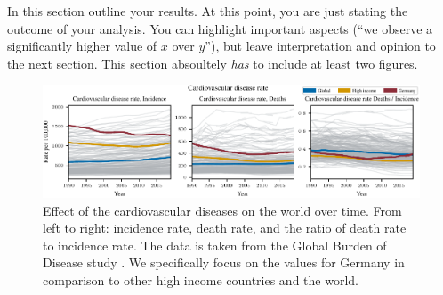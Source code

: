 In this section outline your results. At this point, you are just stating the outcome of your analysis. You can highlight important aspects (``we observe a significantly higher value of $x$ over $y$''), but leave interpretation and opinion to the next section. This section absoultely \emph{has} to include at least two figures.


\begin{figure}[h]
    \vskip 0.2in
    \centering
    \centerline{\includegraphics[]{fig/fig_cardiovascular_disease_mortality_rate.pdf}}
    \caption{Effect of the cardiovascular diseases on the world over time. From left to right: incidence rate, death rate, 
    and the ratio of death rate to incidence rate. The data is taken from the Global Burden of Disease study \citep{GBD2019}. We specifically focus on the values 
    for Germany in comparison to other high income countries and the world.}
    \label{Cardiovascular diseases over time}
\end{figure}
